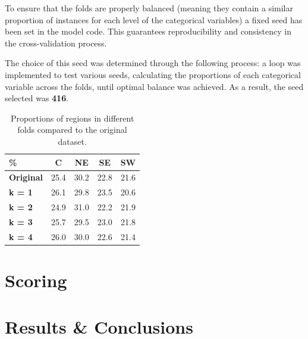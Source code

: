 \documentclass[11pt]{report} %
\begin{document}
To ensure that the folds are properly balanced (meaning they contain a similar proportion of instances for each level of the categorical variables) a fixed seed has been set in the model code. This guarantees reproducibility and consistency in the cross-validation process. 

The choice of this seed was determined through the following process: a loop was implemented to test various seeds, calculating the proportions of each categorical variable across the folds, until optimal balance was achieved. As a result, the seed selected was \textbf{416}.

\begin{table}[h!]
    \centering
    \begin{tabular}{lcccc}
        \toprule
        \textbf{\%} & \textbf{C} & \textbf{NE} & \textbf{SE} & \textbf{SW} \\ 
        \midrule
        \textbf{Original} & 25.4 & 30.2 & 22.8 & 21.6 \\ 
        \textbf{k = 1} & 26.1 & 29.8 & 23.5 & 20.6 \\ 
        \textbf{k = 2} & 24.9 & 31.0 & 22.2 & 21.9 \\ 
        \textbf{k = 3} & 25.7 & 29.5 & 23.0 & 21.8 \\ 
        \textbf{k = 4} & 26.0 & 30.0 & 22.6 & 21.4 \\ 
        \bottomrule
    \end{tabular}
    \caption{Proportions of regions in different folds compared to the original dataset.}
    \label{tab:folds_comparison}
\end{table}



\chapter{Scoring}

\chapter{Results \& Conclusions}
\end{document}
